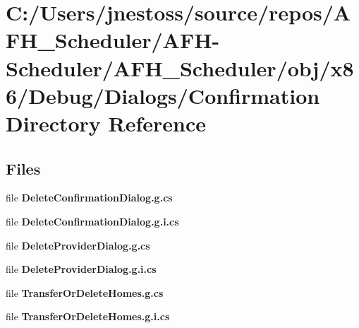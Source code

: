 \section{C\+:/\+Users/jnestoss/source/repos/\+A\+F\+H\+\_\+\+Scheduler/\+A\+F\+H-\/\+Scheduler/\+A\+F\+H\+\_\+\+Scheduler/obj/x86/\+Debug/\+Dialogs/\+Confirmation Directory Reference}
\label{dir_621872aa476c53ccedb7b656bb59740b}
\subsection*{Files}
\begin{DoxyCompactItemize}
\item 
file \textbf{ Delete\+Confirmation\+Dialog.\+g.\+cs}
\item 
file \textbf{ Delete\+Confirmation\+Dialog.\+g.\+i.\+cs}
\item 
file \textbf{ Delete\+Provider\+Dialog.\+g.\+cs}
\item 
file \textbf{ Delete\+Provider\+Dialog.\+g.\+i.\+cs}
\item 
file \textbf{ Transfer\+Or\+Delete\+Homes.\+g.\+cs}
\item 
file \textbf{ Transfer\+Or\+Delete\+Homes.\+g.\+i.\+cs}
\end{DoxyCompactItemize}
